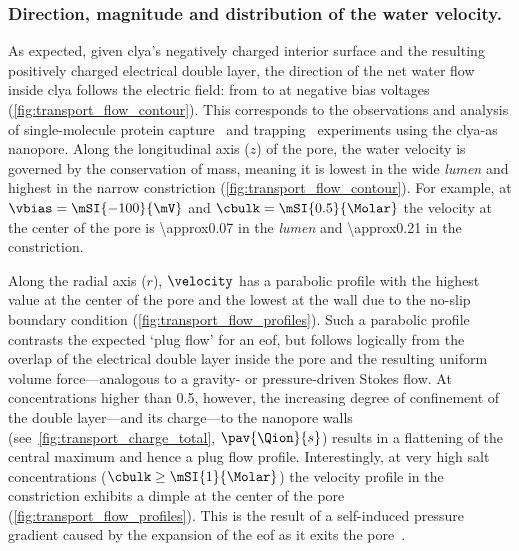 \subsubsection{Direction, magnitude and distribution of the water velocity.}
%
As expected, given \gls{clya}'s negatively charged interior surface and the resulting positively charged
electrical double layer, the direction of the net water flow inside \gls{clya} follows the electric field:
from \cisi{} to \transi{} at negative bias voltages (\cref{fig:transport_flow_contour}). This corresponds to
the observations and analysis of single-molecule protein capture~\cite{Soskine-2013} and
trapping~\cite{Soskine-Biesemans-2015,Biesemans-2015,Willems-Ruic-Biesemans-2019} experiments using the
\gls{clya-as} nanopore. Along the longitudinal axis ($z$) of the pore, the water velocity is governed by the
conservation of mass, meaning it is lowest in the wide \cisi{} \textit{lumen} and highest in the narrow
\transi{} constriction (\cref{fig:transport_flow_contour}). For example, at $\vbias = \mSI{-100}{\mV}$ and
$\cbulk = \mSI{0.5}{\Molar}$ the velocity at the center of the pore is \SI{\approx0.07}{\mps} in the
\textit{lumen} and \SI{\approx0.21}{\mps} in the constriction.

Along the radial axis ($r$), $\velocity$ has a parabolic profile with the highest value at the center of the
pore and the lowest at the wall due to the no-slip boundary condition (\cref{fig:transport_flow_profiles}).
Such a parabolic profile contrasts the expected `plug flow' for an \gls{eof}, but follows logically from the
overlap of the electrical double layer inside the pore and the resulting uniform volume force---analogous to a
gravity- or pressure-driven Stokes flow. At concentrations higher than \SI{0.5}{\Molar}, however, the
increasing degree of confinement of the double layer---and its charge---to the nanopore walls
(see~\cref{fig:transport_charge_total}, $\pav{\Qion}{s}$) results in a flattening of the central maximum and
hence a plug flow profile. Interestingly, at very high salt concentrations ($\cbulk \ge \mSI{1}{\Molar}$) the
velocity profile in the constriction exhibits a dimple at the center of the pore
(\cref{fig:transport_flow_profiles}). This is the result of a self-induced pressure gradient caused by the
expansion of the \gls{eof} as it exits the pore~\cite{Melnikov-2017}.

